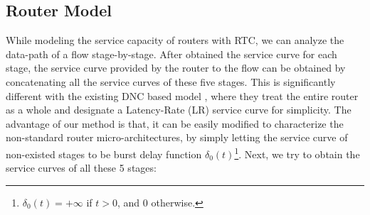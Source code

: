\documentclass[10pt,journal]{IEEEtran}
\begin{document}
\subsection{Router Model}\label{router}
While modeling the service capacity of routers with RTC, we can analyze the data-path of a flow stage-by-stage. After obtained the service curve for each stage, the service curve provided by the router to the flow can be obtained by concatenating all the service curves of these five stages. This is significantly different with the existing DNC based model \cite{qian2009analysis,Qian489900}, where they treat the entire router as a whole and designate a Latency-Rate (LR) service curve for simplicity. The advantage of our method is that, it can be easily modified to characterize the non-standard router micro-architectures, by simply letting the service curve of non-existed stages to be burst delay function $\delta_0(t)$\footnote{$\delta_0(t)=+\infty$ if $t>0$, and 0 otherwise.}. Next, we try to obtain the service curves of all these 5 stages:
\end{document}
